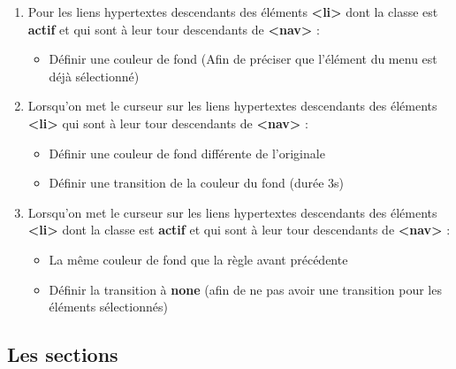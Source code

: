 \documentclass[11pt, a4paper]{article}
\begin{document}
\begin{enumerate}
\begin{multicols}{2}
\begin{itemize}
		\item Mettre le texte en gras
		\item Rendre les coins arrondis : 5px (sans afficher les bordures)
	\end{itemize} 
	\end{multicols}
	\item Pour les liens hypertextes descendants des éléments \textbf{<li>} dont la classe est \textbf{actif} et qui sont à leur tour descendants de \textbf{<nav>}  :
	\begin{itemize}
		\item Définir une couleur de fond (Afin de préciser que l'élément du menu est déjà sélectionné)
	\end{itemize} 

	\item Lorsqu'on met le curseur sur les liens hypertextes descendants des éléments \textbf{<li>} qui sont à leur tour descendants de \textbf{<nav>}  :
	\begin{multicols}{2}
	\begin{itemize}
		\item Définir une couleur de fond différente de l'originale
		\item Définir une transition de la couleur du fond (durée 3s)
	\end{itemize} 
	\end{multicols}
	\item Lorsqu'on met le curseur sur les liens hypertextes descendants des éléments \textbf{<li>} dont la classe est \textbf{actif} et qui sont à leur tour descendants de \textbf{<nav>}  :
	\begin{multicols}{2}
	\begin{itemize}
		\item La même couleur de fond que la règle avant précédente
		\item Définir la transition à \textbf{none} (afin de ne pas avoir une transition pour les éléments sélectionnés)
	\end{itemize} 
	\end{multicols}

\end{enumerate}

\subsection*{Les sections}
\end{document}
